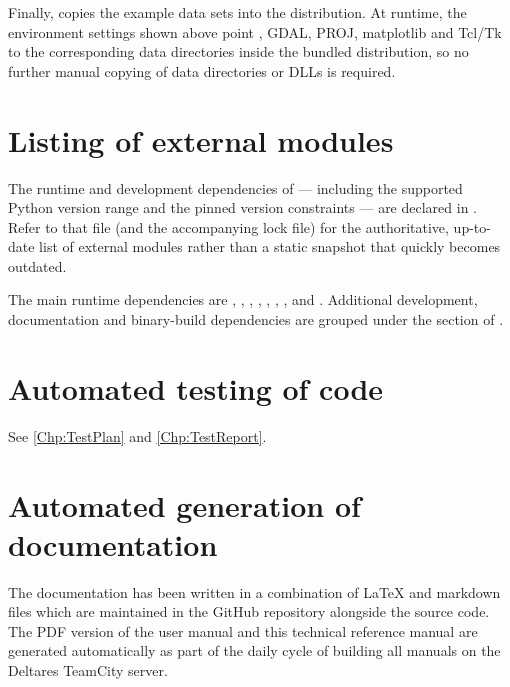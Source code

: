 Finally,  copies the example data sets into the distribution.
At runtime, the environment settings shown above point , GDAL, PROJ, matplotlib and
Tcl/Tk to the corresponding data directories inside the bundled distribution, so no further manual
copying of data directories or DLLs is required.

\section{Listing of external modules}

The runtime and development dependencies of \dfastbe --- including the supported Python version range
and the pinned version constraints --- are declared in .
Refer to that file (and the accompanying lock file) for the authoritative, up-to-date list of
external modules rather than a static snapshot that quickly becomes outdated.

The main runtime dependencies are , , , ,
, , ,  and .
Additional development, documentation and binary-build dependencies are grouped under the
 section of .

\section{Automated testing of code}

See \autoref{Chp:TestPlan} and \autoref{Chp:TestReport}.

\section{Automated generation of documentation}

The documentation has been written in a combination of LaTeX and markdown files which are maintained in the GitHub repository alongside the source code.
The PDF version of the user manual and this technical reference manual are generated automatically as part of the daily cycle of building all manuals on the Deltares TeamCity server.